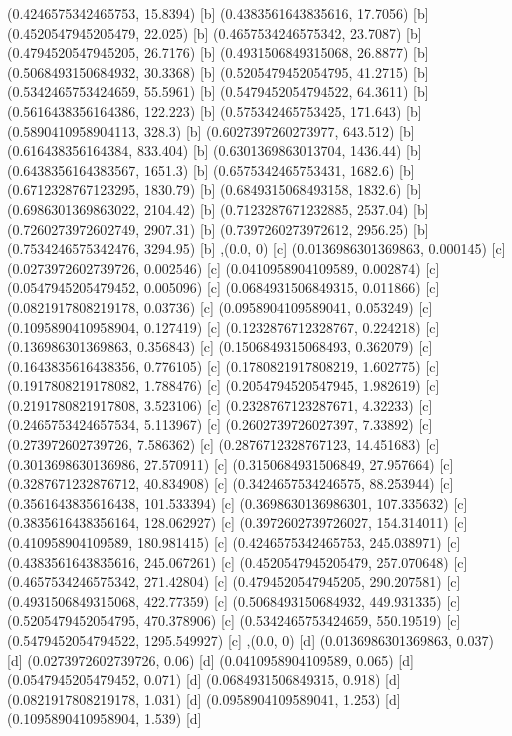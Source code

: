 {{{(0.4246575342465753, 15.8394) [b] 
(0.4383561643835616, 17.7056) [b] 
(0.4520547945205479, 22.025) [b] 
(0.4657534246575342, 23.7087) [b] 
(0.4794520547945205, 26.7176) [b] 
(0.4931506849315068, 26.8877) [b] 
(0.5068493150684932, 30.3368) [b] 
(0.5205479452054795, 41.2715) [b] 
(0.5342465753424659, 55.5961) [b] 
(0.5479452054794522, 64.3611) [b] 
(0.5616438356164386, 122.223) [b] 
(0.575342465753425, 171.643) [b] 
(0.5890410958904113, 328.3) [b] 
(0.6027397260273977, 643.512) [b] 
(0.616438356164384, 833.404) [b] 
(0.6301369863013704, 1436.44) [b] 
(0.6438356164383567, 1651.3) [b] 
(0.6575342465753431, 1682.6) [b] 
(0.6712328767123295, 1830.79) [b] 
(0.6849315068493158, 1832.6) [b] 
(0.6986301369863022, 2104.42) [b] 
(0.7123287671232885, 2537.04) [b] 
(0.7260273972602749, 2907.31) [b] 
(0.7397260273972612, 2956.25) [b] 
(0.7534246575342476, 3294.95) [b] 
},{(0.0, 0) [c] 
(0.0136986301369863, 0.000145) [c] 
(0.0273972602739726, 0.002546) [c] 
(0.0410958904109589, 0.002874) [c] 
(0.0547945205479452, 0.005096) [c] 
(0.0684931506849315, 0.011866) [c] 
(0.0821917808219178, 0.03736) [c] 
(0.0958904109589041, 0.053249) [c] 
(0.1095890410958904, 0.127419) [c] 
(0.1232876712328767, 0.224218) [c] 
(0.136986301369863, 0.356843) [c] 
(0.1506849315068493, 0.362079) [c] 
(0.1643835616438356, 0.776105) [c] 
(0.1780821917808219, 1.602775) [c] 
(0.1917808219178082, 1.788476) [c] 
(0.2054794520547945, 1.982619) [c] 
(0.2191780821917808, 3.523106) [c] 
(0.2328767123287671, 4.32233) [c] 
(0.2465753424657534, 5.113967) [c] 
(0.2602739726027397, 7.33892) [c] 
(0.273972602739726, 7.586362) [c] 
(0.2876712328767123, 14.451683) [c] 
(0.3013698630136986, 27.570911) [c] 
(0.3150684931506849, 27.957664) [c] 
(0.3287671232876712, 40.834908) [c] 
(0.3424657534246575, 88.253944) [c] 
(0.3561643835616438, 101.533394) [c] 
(0.3698630136986301, 107.335632) [c] 
(0.3835616438356164, 128.062927) [c] 
(0.3972602739726027, 154.314011) [c] 
(0.410958904109589, 180.981415) [c] 
(0.4246575342465753, 245.038971) [c] 
(0.4383561643835616, 245.067261) [c] 
(0.4520547945205479, 257.070648) [c] 
(0.4657534246575342, 271.42804) [c] 
(0.4794520547945205, 290.207581) [c] 
(0.4931506849315068, 422.77359) [c] 
(0.5068493150684932, 449.931335) [c] 
(0.5205479452054795, 470.378906) [c] 
(0.5342465753424659, 550.19519) [c] 
(0.5479452054794522, 1295.549927) [c] 
},{(0.0, 0) [d] 
(0.0136986301369863, 0.037) [d] 
(0.0273972602739726, 0.06) [d] 
(0.0410958904109589, 0.065) [d] 
(0.0547945205479452, 0.071) [d] 
(0.0684931506849315, 0.918) [d] 
(0.0821917808219178, 1.031) [d] 
(0.0958904109589041, 1.253) [d] 
(0.1095890410958904, 1.539) [d] 
}}}
